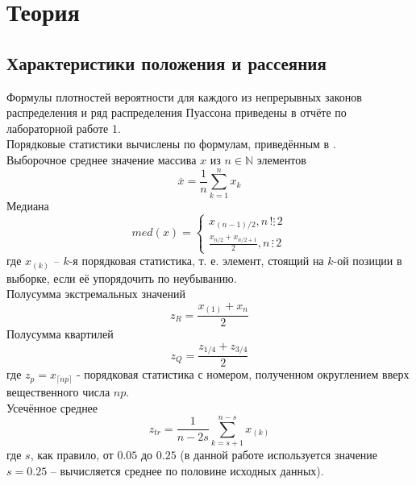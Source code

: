 \documentclass[zuev_report2.tex]{subfiles}
\begin{document}
\section{Теория}
\subsection{Характеристики положения и рассеяния}
Формулы плотностей вероятности для каждого из непрерывных законов распределения и ряд распределения Пуассона приведены в отчёте по лабораторной работе 1.\\
Порядковые статистики вычислены по формулам, приведённым в \cite{maksimov}.\\
Выборочное среднее значение массива $x$ из $n \in \mathds{N}$ элементов
\begin{equation} \label{eq:mean}
\overline{x} = \frac{1}{n} \sum_{k=1}^{n} x_k
\end{equation}
Медиана\\
\begin{equation} \label{eq:med}
med(x) = 
\begin{cases}
x_{(n-1)/2}, n \hspace{2pt} !\vdots \hspace{2pt} 2\\
\frac{x_{n/2} + x_{n/2 + 1}}{2}, n \hspace{2pt} \vdots \hspace{2pt} 2
\end{cases}
\end{equation}
где $x_(k)$ -- $k$-я порядковая статистика, т. е. элемент, стоящий на $k$-ой позиции в выборке, если её упорядочить по неубыванию.\\
Полусумма экстремальных значений\\
\begin{equation} \label{eq:zr}
z_R = \frac{x_{(1)} + x_{n}}{2}
\end{equation}
Полусумма квартилей\\
\begin{equation} \label{eq:zq}
z_Q = \frac{z_{1/4}+z_{3/4}}{2}
\end{equation}
где $z_p = x_{\lceil np \rceil}$ - порядковая статистика с номером, полученном округлением вверх вещественного числа $np$.\\
Усечённое среднее\\
\begin{equation} \label{eq:ztr}
z_{tr} = \frac{1}{n-2s} \sum_{k=s+1}^{n-s} x_{(k)}
\end{equation}
где $s$, как правило, от $0.05$ до $0.25$ (в данной работе используется значение $s=0.25$ -- вычисляется среднее по половине исходных данных).
\end{document}

